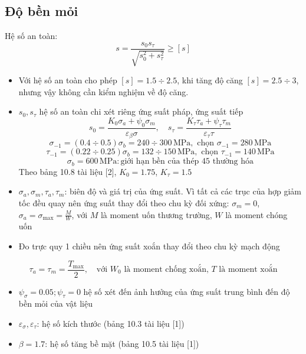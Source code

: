 \subsection{Độ bền mỏi}
Hệ số an toàn:
\begin{equation}
    s = \frac{s_0 s_\tau}{\sqrt{s_0^2 + s_\tau^2}} \geq [s]
\end{equation}
\begin{itemize}
    \item Với hệ số an toàn cho phép $[s] = 1.5 \div 2.5$, khi tăng độ căng $[s] = 2.5 \div 3$, nhưng vậy không cần kiểm nghiệm về độ căng.
    \item $s_0, s_\tau$ hệ số an toàn chi xét riêng ứng suất pháp, ứng suất tiếp
    \begin{equation}
        s_0 = \frac{K_0 \sigma_a + \psi_0 \sigma_m}{\varepsilon_\beta \sigma}, \quad s_\tau = \frac{K_\tau \tau_a + \psi_\tau \tau_m}{\varepsilon_\tau \tau}
    \end{equation}
    \begin{equation}
        \sigma_{-1} = (0.4 \div 0.5) \sigma_b = 240 \div 300 \, \text{MPa}, \text{ chọn } \sigma_{-1} = 280 \, \text{MPa}
    \end{equation}
    \begin{equation}
        \tau_{-1} = (0.22 \div 0.25) \sigma_b = 132 \div 150 \, \text{MPa}, \text{ chọn } \tau_{-1} = 140 \, \text{MPa}
    \end{equation}
    \begin{equation}
        \sigma_b = 600 \, \text{MPa}: \text{giới hạn bền của thép 45 thường hóa}
    \end{equation}
    Theo bảng 10.8 tài liệu [2], $K_0 = 1.75$, $K_\tau = 1.5$
    \item $\sigma_a, \sigma_m, \tau_a, \tau_m$: biên độ và giá trị của ứng suất. Vì tất cả các trục của hợp giảm tốc đều quay nên ứng suất thay đổi theo chu kỳ đối xứng: $\sigma_m = 0$, $\sigma_a = \sigma_{\text{max}} = \frac{M}{W}$, với $M$ là moment uốn thương trường, $W$ là moment chóng uốn
    \item Đo trực quy 1 chiều nên ứng suất xoắn thay đổi theo chu kỳ mạch động
\end{itemize}
\[
\tau_a = \tau_m = \frac{T_{\text{max}}}{2}, \quad \text{với } W_0 \text{ là moment chống xoắn, } T \text{ là moment xoắn}
\]
\begin{itemize}
    \item $\psi_\sigma = 0.05; \psi_\tau = 0$ hệ số xét đến ảnh hưởng của ứng suất trung bình đến độ bền mỏi của vật liệu
    \item $\varepsilon_\sigma, \varepsilon_\tau$: hệ số kích thước (bảng 10.3 tài liệu [1])
    \item $\beta = 1.7$: hệ số tăng bề mặt (bảng 10.5 tài liệu [1])
\end{itemize}

